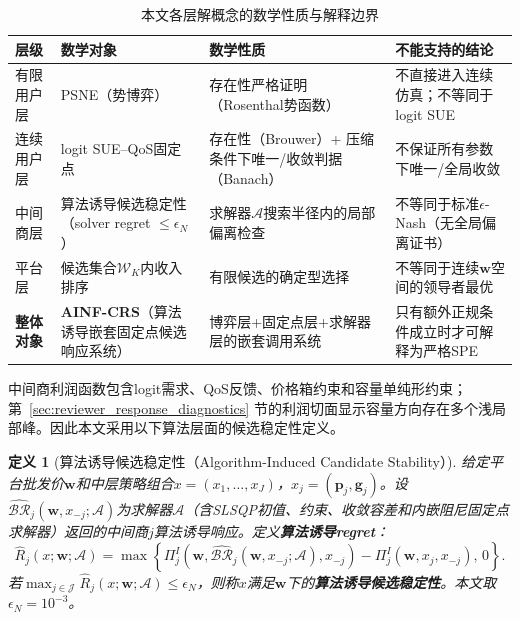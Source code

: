 \documentclass[UTF8,11pt]{ctexart}
\newtheorem{definition}{定义}
\newcommand{\J}{\mathcal{J}}
\newcommand{\w}{\boldsymbol{w}}
\newcommand{\p}{\boldsymbol{p}}
\newcommand{\g}{\boldsymbol{g}}
\begin{document}
\begin{table}[H]
\centering
\caption{本文各层解概念的数学性质与解释边界}
\label{tab:solution_concept_hierarchy}
\small
\begin{tabular}{@{}>{\raggedright\arraybackslash}p{}>{\raggedright\arraybackslash}p{}>{\raggedright\arraybackslash}p{}>{\raggedright\arraybackslash}p{}@{}}
\toprule
层级 & 数学对象 & 数学性质 & 不能支持的结论 \\
\midrule
有限用户层 & PSNE（势博弈） & 存在性严格证明（Rosenthal势函数） & 不直接进入连续仿真；不等同于logit SUE \\
连续用户层 & logit SUE--QoS固定点 & 存在性（Brouwer）+ 压缩条件下唯一/收敛判据（Banach） & 不保证所有参数下唯一/全局收敛 \\
中间商层 & 算法诱导候选稳定性（solver regret $\le\epsilon_N$） & 求解器$\mathcal{A}$搜索半径内的局部偏离检查 & 不等同于标准$\epsilon$-Nash（无全局偏离证书） \\
平台层 & 候选集合$\mathcal{W}_K$内收入排序 & 有限候选的确定型选择 & 不等同于连续$\w$空间的领导者最优 \\
\textbf{整体对象} & \textbf{AINF-CRS}（算法诱导嵌套固定点候选响应系统） & 博弈层+固定点层+求解器层的嵌套调用系统 & 只有额外正规条件成立时才可解释为严格SPE \\
\bottomrule
\end{tabular}
\end{table}

中间商利润函数包含logit需求、QoS反馈、价格箱约束和容量单纯形约束；第~\ref{sec:reviewer_response_diagnostics} 节的利润切面显示容量方向存在多个浅局部峰。因此本文采用以下算法层面的候选稳定性定义。

\begin{definition}[算法诱导候选稳定性（Algorithm-Induced Candidate Stability）]
\label{def:solver_regret_candidate}
给定平台批发价$\w$和中层策略组合$x=(x_1,\ldots,x_J)$，$x_j=(\p_j,\g_j)$。设$\widehat{\mathcal{BR}}_j(\w,x_{-j};\mathcal{A})$为求解器$\mathcal{A}$（含SLSQP初值、约束、收敛容差和内嵌阻尼固定点求解器）返回的中间商$j$算法诱导响应。定义\textbf{算法诱导regret}：
\begin{equation}
  \widehat R_j(x;\w;\mathcal{A})=
  \max\left\{
  \Pi^I_j(\w,\widehat{\mathcal{BR}}_j(\w,x_{-j};\mathcal{A}),x_{-j})
  -\Pi^I_j(\w,x_j,x_{-j}),\,0
  \right\}.
  \label{eq:solver_reported_regret}
\end{equation}
若$\max_{j\in\J}\widehat R_j(x;\w;\mathcal{A})\le \epsilon_N$，则称$x$满足$\w$下的\textbf{算法诱导候选稳定性}。本文取$\epsilon_N=10^{-3}$。
\end{definition}
\end{document}
